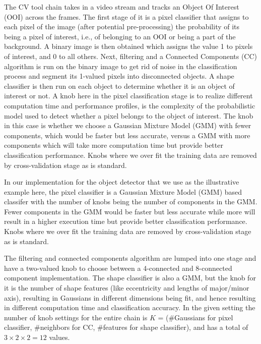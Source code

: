 The CV tool chain takes in a video stream and tracks an Object Of Interest (OOI) across the frames. The first stage of it is a pixel classifier that assigns to each pixel of the image (after potential pre-processing) the probability of its being a pixel of interest, i.e., of belonging to an OOI or being a part of the background. A binary image is then obtained which assigns the value 1 to pixels of interest, and 0 to all others. Next, filtering and a Connected Components (CC) algorithm is run on the binary image to get rid of noise in the classification process and segment its 1-valued pixels into disconnected objects. A shape classifier is then run on each object to determine whether it is an object of interest or not.
A knob here in the pixel classification stage is to realize different computation time and performance profiles, is the complexity of the probabilistic model used to detect whether a pixel belongs to the object of interest. The knob in this case is whether we choose a Gaussian Mixture Model (GMM) with fewer components, which would be faster but less accurate, versus a GMM with more components which will take more computation time but provide better classification performance. Knobs where we over fit the training data are removed by cross-validation stage as is standard.


In our implementation for the object detector that we use as the illustrative example here, the pixel classifier is a Gaussian Mixture Model (GMM) based classifer with the number of knobs being the number of components in the GMM. Fewer components in the GMM would be faster but less accurate while more will result in a higher execution time but provide better classification performance. Knobs where we over fit the training data are removed by cross-validation stage as is standard.

The filtering and connected components algorithm are lumped into one stage and have a two-valued knob to choose between a 4-connected and 8-connected component implementation. The shape classifier is also a GMM, but the knob for it is the number of shape features (like eccentricity and lengths of major/minor axis), resulting in Gaussians in different dimensions being fit, and hence resulting in different computation time and classification accuracy.
In the given setting the number of knob settings for the entire chain is $K$ = (\#Gaussians for pixel classifier, \#neighbors for CC, \#features for shape classifier), and has a total of $3 \times 2 \times 2 = 12$ values.

